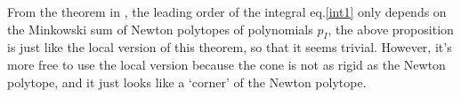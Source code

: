 \documentclass[12pt]{article}
\theoremstyle{definition}
\theoremstyle{plain}
\begin{document}
From the theorem in \cite{}, the leading order of the integral eq.\eqref{int1} 
only depends on the Minkowski sum of Newton polytopes of polynomials $p_I$, 
the above proposition is just like the local version of this theorem, so that 
it seems trivial. However, it's more free to use the local version because 
the cone is not as rigid as the Newton polytope, and it just looks  
like a `corner' of the Newton polytope.

\end{document}
